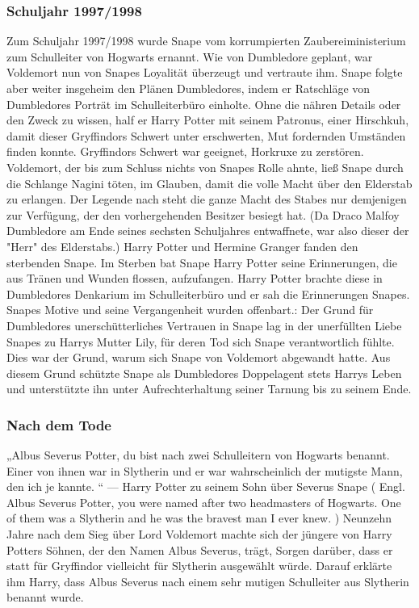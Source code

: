 \documentclass[a4paper, 10pt]{article}
\begin{document}
\subsubsection*{Schuljahr 1997/1998}
Zum Schuljahr 1997/1998 wurde Snape vom korrumpierten Zaubereiministerium zum Schulleiter von Hogwarts ernannt. Wie von Dumbledore geplant, war Voldemort nun von Snapes Loyalität überzeugt und vertraute ihm. Snape folgte aber weiter insgeheim den Plänen Dumbledores, indem er Ratschläge von Dumbledores Porträt im Schulleiterbüro einholte. Ohne die nähren Details oder den Zweck zu wissen, half er Harry Potter mit seinem Patronus, einer Hirschkuh, damit dieser Gryffindors Schwert unter erschwerten, Mut fordernden Umständen finden konnte. Gryffindors Schwert war geeignet, Horkruxe zu zerstören. Voldemort, der bis zum Schluss nichts von Snapes Rolle ahnte, ließ Snape durch die Schlange Nagini töten, im Glauben, damit die volle Macht über den Elderstab zu erlangen. Der Legende nach steht die ganze Macht des Stabes nur demjenigen zur Verfügung, der den vorhergehenden Besitzer besiegt hat. (Da Draco Malfoy Dumbledore am Ende seines sechsten Schuljahres entwaffnete, war also dieser der "Herr" des Elderstabs.) Harry Potter und Hermine Granger fanden den sterbenden Snape. Im Sterben bat Snape Harry Potter seine Erinnerungen, die aus Tränen und Wunden flossen, aufzufangen. Harry Potter brachte diese in Dumbledores Denkarium im Schulleiterbüro und er sah die Erinnerungen Snapes. Snapes Motive und seine Vergangenheit wurden offenbart.: Der Grund für Dumbledores unerschütterliches Vertrauen in Snape lag in der unerfüllten Liebe Snapes zu Harrys Mutter Lily, für deren Tod sich Snape verantwortlich fühlte. Dies war der Grund, warum sich Snape von Voldemort abgewandt hatte. Aus diesem Grund schützte Snape als Dumbledores Doppelagent stets Harrys Leben und unterstützte ihn unter Aufrechterhaltung seiner Tarnung bis zu seinem Ende.

\subsubsection*{\large Nach dem Tode}
„Albus Severus Potter, du bist nach zwei Schulleitern von Hogwarts benannt. Einer von ihnen war in Slytherin und er war wahrscheinlich der mutigste Mann, den ich je kannte. “
\vspace{10pt}
\newline
— Harry Potter zu seinem Sohn über Severus Snape
\vspace{10pt}
\newline
(  Engl.  Albus Severus Potter, you were named after two headmasters of Hogwarts. One of them was a Slytherin and he was the bravest man I ever knew. )
\vspace{10pt}
\newline
Neunzehn Jahre nach dem Sieg über Lord Voldemort machte sich der jüngere von Harry Potters Söhnen, der den Namen Albus Severus, trägt, Sorgen darüber, dass er statt für Gryffindor vielleicht für Slytherin ausgewählt würde. Darauf erklärte ihm Harry, dass Albus Severus nach einem sehr mutigen Schulleiter aus Slytherin benannt wurde.
\end{document}

